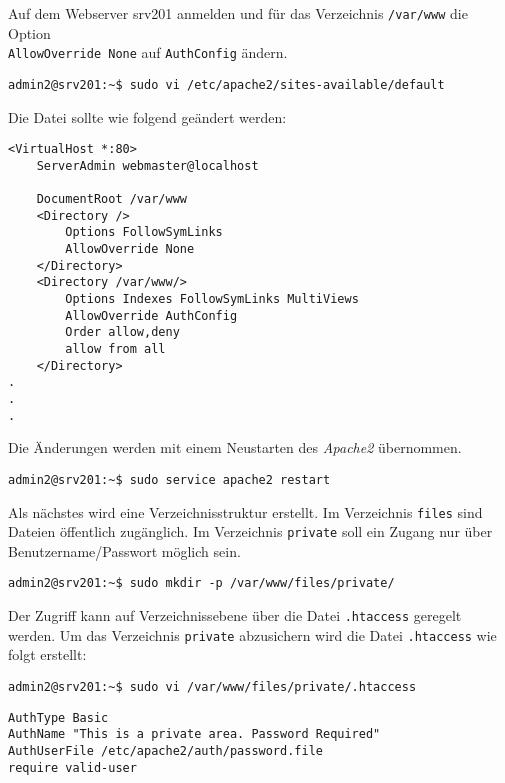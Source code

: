 Auf dem Webserver srv201 anmelden und für das Verzeichnis \texttt{/var/www} die 
Option \\
\texttt{AllowOverride None} auf \texttt{AuthConfig} ändern.

\begin{lstlisting}
admin2@srv201:~$ sudo vi /etc/apache2/sites-available/default
\end{lstlisting}

Die Datei sollte wie folgend geändert werden:

\begin{scriptsize}
\begin{lstlisting}
<VirtualHost *:80>
	ServerAdmin webmaster@localhost

	DocumentRoot /var/www
	<Directory />
		Options FollowSymLinks
		AllowOverride None
	</Directory>
	<Directory /var/www/>
		Options Indexes FollowSymLinks MultiViews
		AllowOverride AuthConfig
		Order allow,deny
		allow from all
	</Directory>
.
.
.
\end{lstlisting}
\end{scriptsize}
Die Änderungen werden mit einem Neustarten des \textit{Apache2} übernommen.

\begin{lstlisting}
admin2@srv201:~$ sudo service apache2 restart
\end{lstlisting}

Als nächstes wird eine Verzeichnisstruktur erstellt. Im Verzeichnis
\texttt{files} sind Dateien öffentlich zugänglich. Im Verzeichnis
\texttt{private} soll ein Zugang nur über Benutzername/Passwort möglich sein.

\begin{lstlisting}
admin2@srv201:~$ sudo mkdir -p /var/www/files/private/
\end{lstlisting}

Der Zugriff kann auf Verzeichnissebene über die Datei \texttt{.htaccess}
geregelt werden. Um das Verzeichnis \texttt{private} abzusichern wird die Datei
\texttt{.htaccess} wie folgt erstellt:

\begin{lstlisting}
admin2@srv201:~$ sudo vi /var/www/files/private/.htaccess
\end{lstlisting}

\begin{scriptsize}
\begin{lstlisting}
AuthType Basic
AuthName "This is a private area. Password Required"
AuthUserFile /etc/apache2/auth/password.file
require valid-user
\end{lstlisting}
\end{scriptsize}

